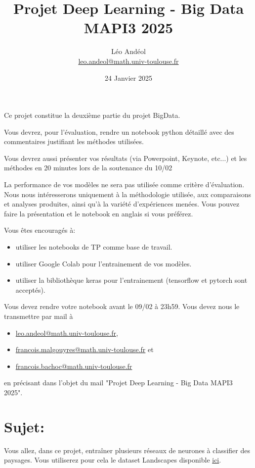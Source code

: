 \documentclass{article}
\title{Projet Deep Learning - Big Data MAPI3 2025}
\author{
    L\'eo And\'eol \\
    \href{mailto:leo.andeol@math.univ-toulouse.fr}{leo.andeol@math.univ-toulouse.fr}
}
\date{24 Janvier 2025}
\begin{document}
\maketitle



Ce projet constitue la deuxième partie du projet BigData.

Vous devrez, pour l'évaluation, rendre un notebook python détaillé avec des commentaires justifiant les méthodes utilisées.

Vous devrez aussi présenter vos résultats (via Powerpoint, Keynote, etc...) et les méthodes en 20 minutes lors de la soutenance du 10/02

La performance de vos modèles ne sera pas utilisée comme critère d'évaluation. Nous nous intéresserons uniquement à la méthodologie utilisée, aux comparaisons et analyses produites, ainsi qu'à la variété d'expériences menées.
Vous pouvez faire la présentation et le notebook en anglais si vous préférez.


Vous êtes encouragés à:
\begin{itemize}
    \item utiliser les notebooks de TP comme base de travail.
    \item utiliser Google Colab pour l'entrainement de vos modèles.
    \item utiliser la bibliothèque keras pour l'entrainement (tensorflow et pytorch sont acceptés).
\end{itemize}

Vous devez rendre votre notebook avant le 09/02 à 23h59.
Vous devez nous le transmettre par mail à
\begin{itemize}
    \item \href{mailto:leo.andeol@math.univ-toulouse.fr}{leo.andeol@math.univ-toulouse.fr},
    \item \href{mailto:francois.malgouyres@math.univ-toulouse.fr}{francois.malgouyres@math.univ-toulouse.fr} et
    \item \href{mailto:francois.bachoc@math.univ-toulouse.fr}{francois.bachoc@math.univ-toulouse.fr}
\end{itemize}
en précisant dans l'objet du mail "Projet Deep Learning - Big Data MAPI3 2025".

\section{Sujet:}
Vous allez, dans ce projet, entraîner plusieurs réseaux de neurones à classifier des paysages. Vous utiliserez pour cela le dataset Landscapes disponible \href{https://github.com/ml5js/ml5-data-and-models/tree/master/datasets/images/landscapes}{ici}.
\end{document}
